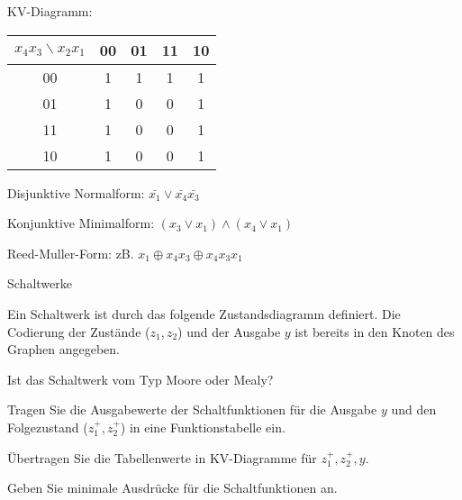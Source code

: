 \documentclass{exercisesheet}
\begin{document}
\begin{solutions}
  \item KV-Diagramm:
  \begin{tabular}{c|cccc}
    $x_4x_3\backslash x_2x_1$ & 00 & 01 & 11 & 10 \\
    \hline
    00                        & 1  & 1  & 1  & 1  \\
    01                        & 1  & 0  & 0  & 1  \\
    11                        & 1  & 0  & 0  & 1  \\
    10                        & 1  & 0  & 0  & 1  \\
  \end{tabular}\par
  Disjunktive Normalform: $\bar{x_1}\lor\bar{x_4}\bar{x_3}$
  \item Konjunktive Minimalform: $(x_3\lor x_1)\land(x_4\lor x_1)$
  \item Reed-Muller-Form: zB. $x_1\oplus x_4x_3\oplus x_4x_3x_1$
\end{solutions}

\begin{eexercises}[10]{Schaltwerke}{
    Ein Schaltwerk ist durch das folgende Zustandsdiagramm definiert. Die Codierung der Zustände ($z_1, z_2$) und der Ausgabe $y$ ist bereits in den Knoten des Graphen angegeben.\par
    \centering
  }
  \item Ist das Schaltwerk vom Typ Moore oder Mealy?
  \item Tragen Sie die Ausgabewerte der Schaltfunktionen für die Ausgabe $y$ und den Folgezustand ($z_1^+, z_2^+$) in eine Funktionstabelle ein.
  \item Übertragen Sie die Tabellenwerte in KV-Diagramme für $z_1^+, z_2^+, y$.
  \item Geben Sie minimale Ausdrücke für die Schaltfunktionen an.
\end{eexercises}
\end{document}
